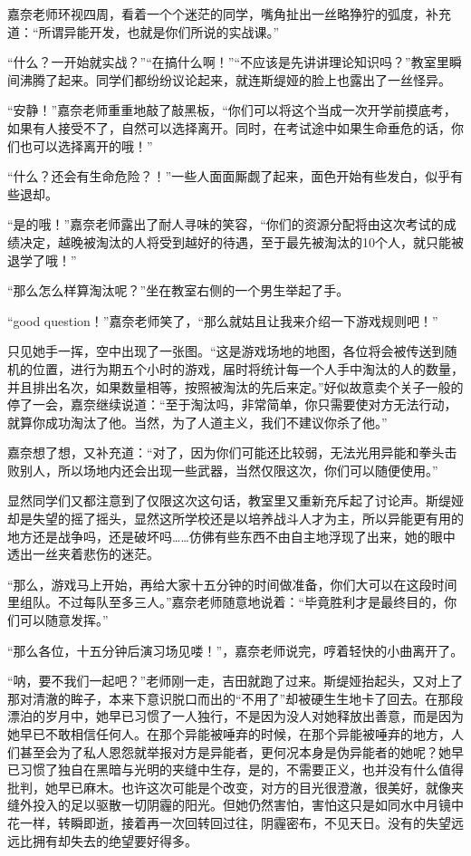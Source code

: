 \documentclass[a5paper, punct=kaiming, fontset=none]{ctexart}
\begin{document}
嘉奈老师环视四周，看着一个个迷茫的同学，嘴角扯出一丝略狰狞的弧度，补充道：“所谓异能开发，也就是你们所说的实战课。”

“什么？一开始就实战？”“在搞什么啊！”“不应该是先讲讲理论知识吗？”教室里瞬间沸腾了起来。同学们都纷纷议论起来，就连斯缇娅的脸上也露出了一丝怪异。

“安静！”嘉奈老师重重地敲了敲黑板，“你们可以将这个当成一次开学前摸底考，如果有人接受不了，自然可以选择离开。同时，在考试途中如果生命垂危的话，你们也可以选择离开的哦！”

“什么？还会有生命危险？！”一些人面面厮觑了起来，面色开始有些发白，似乎有些退却。

“是的哦！”嘉奈老师露出了耐人寻味的笑容，“你们的资源分配将由这次考试的成绩决定，越晚被淘汰的人将受到越好的待遇，至于最先被淘汰的10个人，就只能被退学了哦！”

“那么怎么样算淘汰呢？”坐在教室右侧的一个男生举起了手。

“good question！”嘉奈老师笑了，“那么就姑且让我来介绍一下游戏规则吧！”

只见她手一挥，空中出现了一张图。“这是游戏场地的地图，各位将会被传送到随机的位置，进行为期五个小时的游戏，届时将统计每一个人手中淘汰的人的数量，并且排出名次，如果数量相等，按照被淘汰的先后来定。”好似故意卖个关子一般的停了一会，嘉奈继续说道：“至于淘汰吗，非常简单，你只需要使对方无法行动，就算你成功淘汰了他。当然，为了人道主义，我们不建议你杀了他。”

嘉奈想了想，又补充道：“对了，因为你们可能还比较弱，无法光用异能和拳头击败别人，所以场地内还会出现一些武器，当然仅限这次，你们可以随便使用。”

显然同学们又都注意到了仅限这次这句话，教室里又重新充斥起了讨论声。斯缇娅却是失望的摇了摇头，显然这所学校还是以培养战斗人才为主，所以异能更有用的地方还是战争吗，还是破坏吗……仿佛有些东西不由自主地浮现了出来，她的眼中透出一丝夹着悲伤的迷茫。

“那么，游戏马上开始，再给大家十五分钟的时间做准备，你们大可以在这段时间里组队。不过每队至多三人。”嘉奈老师随意地说着：“毕竟胜利才是最终目的，你们可以随意发挥。”

“那么各位，十五分钟后演习场见喽！”，嘉奈老师说完，哼着轻快的小曲离开了。

“呐，要不我们一起吧？”老师刚一走，吉田就跑了过来。斯缇娅抬起头，又对上了那对清澈的眸子，本来下意识脱口而出的“不用了”却被硬生生地卡了回去。在那段漂泊的岁月中，她早已习惯了一人独行，不是因为没人对她释放出善意，而是因为她早已不敢相信任何人。在那个异能被唾弃的时候，在那个异能被唾弃的地方，人们甚至会为了私人恩怨就举报对方是异能者，更何况本身是伪异能者的她呢？她早已习惯了独自在黑暗与光明的夹缝中生存，是的，不需要正义，也并没有什么值得批判，她早已麻木。也许这次可能是个改变，对方的目光很澄澈，很美好，就像夹缝外投入的足以驱散一切阴霾的阳光。但她仍然害怕，害怕这只是如同水中月镜中花一样，转瞬即逝，接着再一次回转回过往，阴霾密布，不见天日。没有的失望远远比拥有却失去的绝望要好得多。
\end{document}

